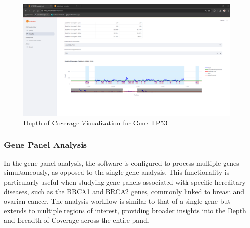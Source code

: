 \begin{itemize}
    \begin{figure}[H]
        \centering
        \includegraphics[width=\textwidth]{figs/v3.5.png}
        \caption{Depth of Coverage Visualization for Gene TP53}
        \label{fig:coverage_plot}
    \end{figure}
\end{itemize}

\subsubsection{\textbf{Gene Panel Analysis}}

In the gene panel analysis, the software is configured to process multiple genes simultaneously, as opposed to the single gene analysis. This functionality is particularly useful when studying gene panels associated with specific hereditary diseases, such as the BRCA1 and BRCA2 genes, commonly linked to breast and ovarian cancer. The analysis workflow is similar to that of a single gene but extends to multiple regions of interest, providing broader insights into the Depth and Breadth of Coverage across the entire panel.

